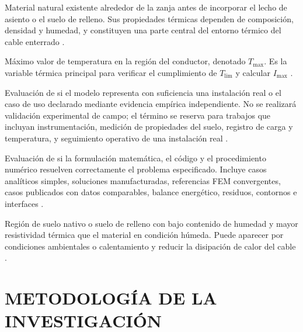 \documentclass[11pt,a4paper,oneside]{report}
\newcommand{\Tmax}{T_{\max}}
\newcommand{\Imax}{I_{\max}}
\begin{document}
\begin{description}[style=nextline,itemsep=0.5\baselineskip,parsep=0pt,topsep=0.25\baselineskip]
  \item[Suelo nativo.] Material natural existente alrededor de la zanja antes de incorporar el lecho de asiento o el suelo de relleno. Sus propiedades térmicas dependen de composición, densidad y humedad, y constituyen una parte central del entorno térmico del cable enterrado \parencites{farouki1981thermal,devries1966thermal}[1,6--9]{khumalo2025}[secciones 4--6]{ieee442}.

  \item[Temperatura máxima del conductor.] Máximo valor de temperatura en la región del conductor, denotado $\Tmax$. Es la variable térmica principal para verificar el cumplimiento de $T_{\mathrm{lim}}$ y calcular $\Imax$ \parencites[752--760]{neher1957}{anders2005}[cláusulas 4--5]{iec60287}[3--6]{enescu2021}.

  \item[Validación.] Evaluación de si el modelo representa con suficiencia una instalación real o el caso de uso declarado mediante evidencia empírica independiente. No se realizará validación experimental de campo; el término se reserva para trabajos que incluyan instrumentación, medición de propiedades del suelo, registro de carga y temperatura, y seguimiento operativo de una instalación real \parencites{cigre2022}[93--99]{cigre2025}[350--351]{gregor2013}.

  \item[Verificación.] Evaluación de si la formulación matemática, el código y el procedimiento numérico resuelven correctamente el problema especificado. Incluye casos analíticos simples, soluciones manufacturadas, referencias FEM convergentes, casos publicados con datos comparables, balance energético, residuos, contornos e interfaces \parencites{cigre2022}[3--4,93--99]{cigre2025}[350--351]{gregor2013}.

  \item[Zona seca.] Región de suelo nativo o suelo de relleno con bajo contenido de humedad y mayor resistividad térmica que el material en condición húmeda. Puede aparecer por condiciones ambientales o calentamiento y reducir la disipación de calor del cable \parencites[4--6]{enescu2021}[1,6--9]{khumalo2025}[14851--14852]{fariz2026}.
\end{description}
\endgroup

\chapter{METODOLOGÍA DE LA INVESTIGACIÓN}
\label{ch:metodologia}
\thispagestyle{empty}
\end{document}
